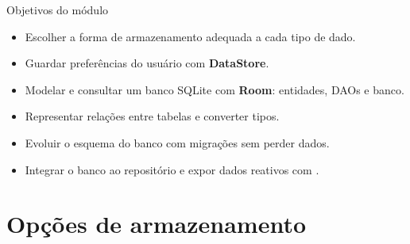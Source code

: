 \documentclass[aspectratio=169,10pt]{beamer}
\begin{document}
\capa

\begin{frame}{Objetivos do módulo}
  \begin{conceito}
    \begin{itemize}
      \item Escolher a forma de armazenamento adequada a cada tipo de dado.
      \item Guardar preferências do usuário com \textbf{DataStore}.
      \item Modelar e consultar um banco SQLite com \textbf{Room}: entidades, DAOs e banco.
      \item Representar relações entre tabelas e converter tipos.
      \item Evoluir o esquema do banco com migrações sem perder dados.
      \item Integrar o banco ao repositório e expor dados reativos com .
    \end{itemize}
  \end{conceito}
\end{frame}

\sumario



\section{Opções de armazenamento}
\end{document}
